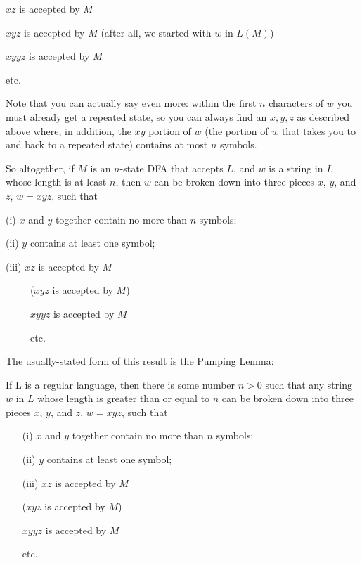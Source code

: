 $xz$ is accepted by $M$

$xyz$ is accepted by $M$ (after all, we started with $w$ in $L(M)$)

$xyyz$ is accepted by $M$ 

etc.

Note that you can actually say even more: within the first $n$ characters of
$w$ you must already get a repeated state, so you can always find an $x,y,z$ as
described above where, in addition, the $xy$ portion of $w$ (the portion of $w$
that takes you to and back to a repeated state) contains at most $n$ symbols.

So altogether, if $M$ is an $n$-state DFA that accepts $L$, and $w$ is a string
in $L$ whose length is at least $n$, then $w$ can be broken down into three
pieces $x$, $y$, and $z$, $w=xyz$, such that

(i) $x$ and $y$ together contain no more than $n$ symbols;

(ii) $y$ contains at least one symbol;

(iii) $xz$ is accepted by $M$

\ \ \ \ \ ($xyz$ is accepted by $M$)

\ \ \ \ \ $xyyz$ is accepted by $M$

\ \ \ \ \ etc.

\smallskip

The usually-stated form of this result is the Pumping Lemma:

\begin{theorem} If L is a regular language, then there is some number $n>0$ 
such that any
string $w$ in $L$ whose length is greater than or equal to $n$ can
be broken down into three
pieces $x$, $y$, and $z$, $w=xyz$, such that
\begin{itemize}
\item[(i)] $x$ and $y$ together contain no more than $n$ symbols;

\item[(ii)] $y$ contains at least one symbol;

\item[(iii)] $xz$ is accepted by $M$

($xyz$ is accepted by $M$)

$xyyz$ is accepted by $M$

etc.
\end{itemize}
\end{theorem}

